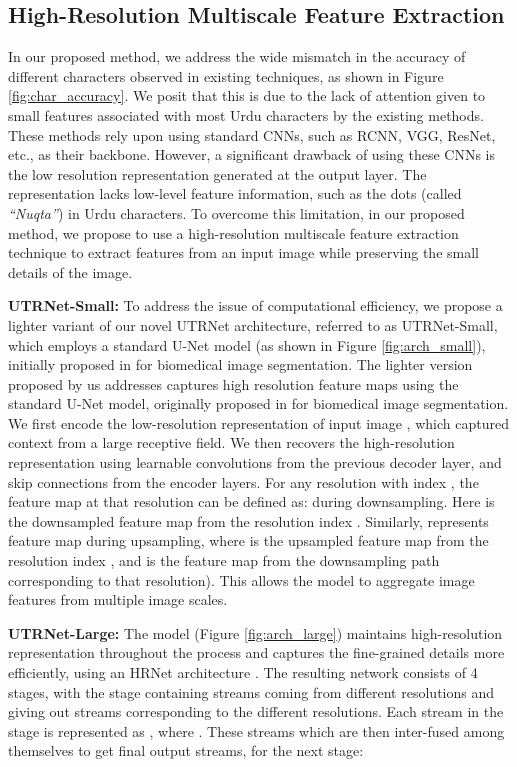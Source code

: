 \documentclass[runningheads]{llncs}
\newcommand{\ModelName}{{UTRNet}\xspace}
\newcommand{\mypara}[1]{\vspace{0.5em} \noindent \textbf{#1:}}
\begin{document}
\subsection{High-Resolution Multiscale Feature Extraction}
\label{architecture-high-resolution-cnn}

In our proposed method, we address the wide mismatch in the accuracy of different characters observed in existing techniques, as shown in Figure \ref{fig:char_accuracy}. We posit that this is due to the lack of attention given to small features associated with most Urdu characters by the existing methods. These methods rely upon using standard CNNs, such as RCNN\cite{rcnn_orig}, VGG\cite{vgg_orig}, ResNet\cite{resnet_orig}, etc., as their backbone. However, a significant drawback of using these CNNs is the low resolution representation generated at the output layer. The representation lacks low-level feature information, such as the dots (called \textit{``Nuqta''}) in Urdu characters. To overcome this limitation, in our proposed method, we propose to use a high-resolution multiscale feature extraction technique to extract features from an input image while preserving the small details of the image.

\mypara{\ModelName-Small}
To address the issue of computational efficiency, we propose a lighter variant of our novel \ModelName architecture, referred to as \ModelName-Small, which employs a standard U-Net model (as shown in Figure \ref{fig:arch_small}), initially proposed in \cite{unet_orig_paper} for biomedical image segmentation. The lighter version proposed by us addresses captures high resolution feature maps using the standard U-Net model, originally proposed in \cite{unet_orig_paper} for biomedical image segmentation. We first encode the low-resolution representation of input image , which captured context from a large receptive field. We then recovers the high-resolution representation using learnable convolutions from the previous decoder layer, and skip connections from the encoder layers. For any resolution with index , the feature map at that resolution can be defined as:  during downsampling. Here  is the downsampled feature map from the resolution index . Similarly,  represents feature map during upsampling, where  is the upsampled feature map from the resolution index , and  is the feature map from the downsampling path corresponding to that resolution). This allows the model to aggregate image features from multiple image scales.

\mypara{\ModelName-Large}
The model (Figure \ref{fig:arch_large}) maintains high-resolution representation throughout the process and captures the fine-grained details more efficiently, using an HRNet architecture \cite{hrnet_orig}. The resulting network consists of 4 stages, with the  stage containing streams coming from  different resolutions and giving out  streams corresponding to the different resolutions. Each stream in the  stage is represented as , where . These streams which are then inter-fused among themselves to get  final output streams,  for the next stage:
\end{document}
